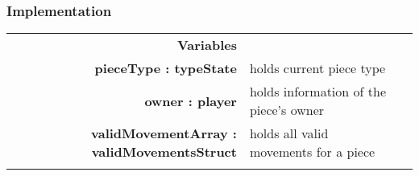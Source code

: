 \documentclass[10pt]{article}
\begin{document}
    \subsubsection{Implementation}
        \begin{tabularx}{\linewidth}{ >{\bfseries}r Xp{5cm} }
            Variables       & \begin{tabular}[t]{@{} l p{8cm}} 
                                     & \\
                                    pieceType : typeState & holds current piece type \\
                                    owner : player & holds information of the piece's owner \\
									validMovementArray : validMovementsStruct & holds all valid movements for a piece \\
                              \end{tabular} \\


\end{tabularx}
\end{document}
